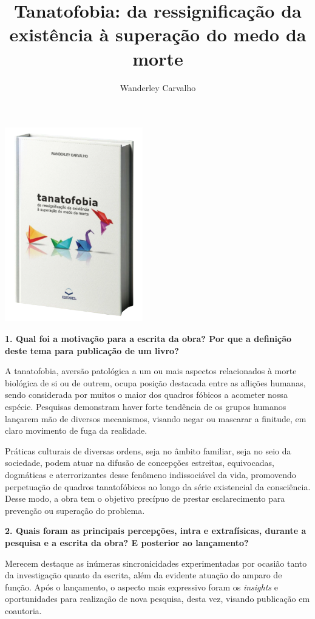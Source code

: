 \documentclass{gescons}
\author{Wanderley Carvalho}
\title{Tanatofobia: da ressignificação da existência à superação do medo da morte}
\begin{document}
    \makeentrevistatitle

    \begin{multicols}{2}

\begin{center}
    \vspace{-0.5cm}
    \includegraphics[width=6cm]{articles/entrevista/mockups/Wanderley_Carvalho.png}
\end{center}


\textbf{1. Qual foi a motivação para a escrita da obra? Por que a definição deste tema para publicação de um livro?}


A tanatofobia, aversão patológica a um ou mais aspectos relacionados à
morte biológica de si ou de outrem, ocupa posição destacada entre as
aflições humanas, sendo considerada por muitos o maior dos quadros
fóbicos a acometer nossa espécie. Pesquisas demonstram haver forte
tendência de os grupos humanos lançarem mão de diversos mecanismos,
visando negar ou mascarar a finitude, em claro movimento de fuga da
realidade.

Práticas culturais de diversas ordens, seja no âmbito familiar, seja no
seio da sociedade, podem atuar na difusão de concepções estreitas,
equivocadas, dogmáticas e aterrorizantes desse fenômeno indissociável da
vida, promovendo perpetuação de quadros tanatofóbicos ao longo da série
existencial da consciência. Desse modo, a obra tem o objetivo precípuo
de prestar esclarecimento para prevenção ou superação do problema.

\textbf{2. Quais foram as principais percepções, intra e extrafísicas, durante a pesquisa e a escrita da obra? E posterior ao lançamento?}

Merecem destaque as inúmeras sincronicidades experimentadas por ocasião
tanto da investigação quanto da escrita, além da evidente atuação do
amparo de função. Após o lançamento, o aspecto mais expressivo foram os
\emph{insights} e oportunidades para realização de nova pesquisa, desta
vez, visando publicação em coautoria.


\end{multicols}
\end{document}
